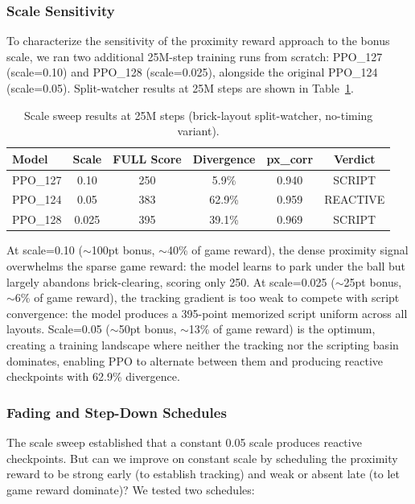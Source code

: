 \documentclass[11pt]{article}
\begin{document}
\subsubsection{Scale Sensitivity}
\label{sec:scale}

To characterize the sensitivity of the proximity reward approach to the bonus
scale, we ran two additional 25M-step training runs from scratch: PPO\_127
(scale=0.10) and PPO\_128 (scale=0.025), alongside the original PPO\_124
(scale=0.05). Split-watcher results at 25M steps are shown in
Table~\ref{tab:scale}.

\begin{table}[ht]
\centering
\begin{tabular}{lccccc}
\toprule
\textbf{Model} & \textbf{Scale} & \textbf{FULL Score} & \textbf{Divergence} &
\textbf{px\_corr} & \textbf{Verdict} \\
\midrule
PPO\_127 & 0.10   & 250  & 5.9\%  & 0.940 & SCRIPT \\
PPO\_124 & 0.05   & 383  & 62.9\% & 0.959 & REACTIVE \\
PPO\_128 & 0.025  & 395  & 39.1\% & 0.969 & SCRIPT \\
\bottomrule
\end{tabular}
\caption{Scale sweep results at 25M steps (brick-layout split-watcher,
no-timing variant).}
\label{tab:scale}
\end{table}

At scale=0.10 ($\sim$100pt bonus, $\sim$40\% of game reward), the dense
proximity signal overwhelms the sparse game reward: the model learns to park
under the ball but largely abandons brick-clearing, scoring only 250. At
scale=0.025 ($\sim$25pt bonus, $\sim$6\% of game reward), the tracking
gradient is too weak to compete with script convergence: the model produces a
395-point memorized script uniform across all layouts. Scale=0.05
($\sim$50pt bonus, $\sim$13\% of game reward) is the optimum,
creating a training landscape where neither the tracking nor the scripting
basin dominates, enabling PPO to alternate between them and producing
reactive checkpoints with 62.9\% divergence.

\subsubsection{Fading and Step-Down Schedules}
\label{sec:fading}

The scale sweep established that a constant 0.05 scale produces reactive
checkpoints. But can we improve on constant scale by scheduling the proximity
reward to be strong early (to establish tracking) and weak or absent late (to
let game reward dominate)? We tested two schedules:
\end{document}
